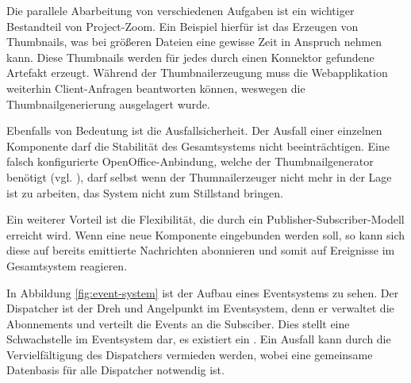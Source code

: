 Die parallele Abarbeitung von verschiedenen Aufgaben ist ein wichtiger Bestandteil von Project-Zoom. Ein Beispiel hierfür ist das Erzeugen von Thumbnails, was bei größeren Dateien eine gewisse Zeit in Anspruch nehmen kann. Diese Thumbnails werden für jedes durch einen Konnektor gefundene Artefakt erzeugt. Während der Thumbnailerzeugung muss die Webapplikation weiterhin Client-Anfragen beantworten können, weswegen die Thumbnailgenerierung ausgelagert wurde.

Ebenfalls von Bedeutung ist die Ausfallsicherheit. Der Ausfall einer einzelnen Komponente darf die Stabilität des Gesamtsystems nicht beeinträchtigen. Eine falsch konfigurierte OpenOffice-Anbindung, welche der Thumbnailgenerator benötigt (vgl. \cite{bp-dome}), darf selbst wenn der Thumnailerzeuger nicht mehr in der Lage ist zu arbeiten, das System nicht zum Stillstand bringen.

Ein weiterer Vorteil ist die Flexibilität, die durch ein Publisher-Subscriber-Modell erreicht wird. Wenn eine neue Komponente eingebunden werden soll, so kann sich diese auf bereits emittierte Nachrichten abonnieren und somit auf Ereignisse im Gesamtsystem reagieren.

In Abbildung \ref{fig:event-system} ist der Aufbau eines Eventsystems zu sehen. Der Dispatcher ist der Dreh und Angelpunkt im Eventsystem, denn er verwaltet die Abonnements und verteilt die Events an die Subsciber. Dies stellt eine Schwachstelle im Eventsystem dar, es existiert ein . Ein Ausfall kann durch die Vervielfältigung des Dispatchers vermieden werden, wobei eine gemeinsame Datenbasis für alle Dispatcher notwendig ist. 
